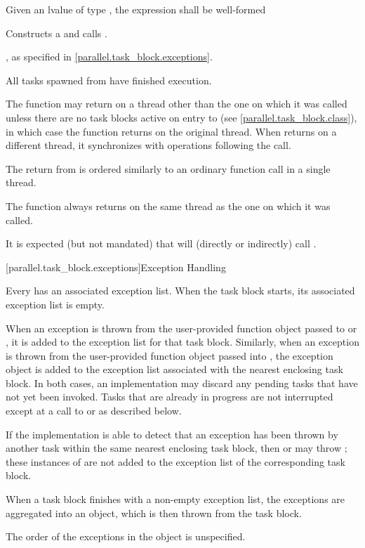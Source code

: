\begin{itemdescr}
\pnum
\requires Given an lvalue  of type , the expression  shall be well-formed

\pnum
\effects Constructs a   and calls .

\pnum
\throws {}, as specified in \ref{parallel.task_block.exceptions}.

\pnum
\postconditions All tasks spawned from  have finished execution.

\pnum
\remarks The  function may return on a thread
other than the one on which it was called unless there are no task blocks
active on entry to  (see
    \ref{parallel.task_block.class}), in which case the function returns on the
original thread. When  returns on a different thread, it
synchronizes with operations following the call. \begin{note}The return from
 is ordered similarly to an ordinary function
call in a single thread.\end{note} The 
function always returns on the same thread as the one on which it was called.

\pnum
\realnotes It is expected (but not mandated) that  will (directly or indirectly) call .
\end{itemdescr}

[parallel.task_block.exceptions]{Exception Handling}

\pnum
Every  has an associated exception list. When the task block starts, its associated exception list is empty.

\pnum
When an exception is thrown from the user-provided function object passed
to  or , it is
added to the exception list for that task block. Similarly, when an exception
is thrown from the user-provided function object passed into
, the exception object is added to the exception list
associated with the nearest enclosing task block. In both cases, an
implementation may discard any pending tasks that have not yet been invoked.
Tasks that are already in progress are not interrupted except at a call to
 or  as described below.

\pnum
If the implementation is able to detect that an exception has been thrown
by another task within the same nearest enclosing task block, then
 or  may throw
; these instances of
 are not added to the exception list of the
corresponding task block.

\pnum
When a task block finishes with a non-empty exception list, the
exceptions are aggregated into an  object, which is then thrown
from the task block.

\pnum
The order of the exceptions in the  object is unspecified.

